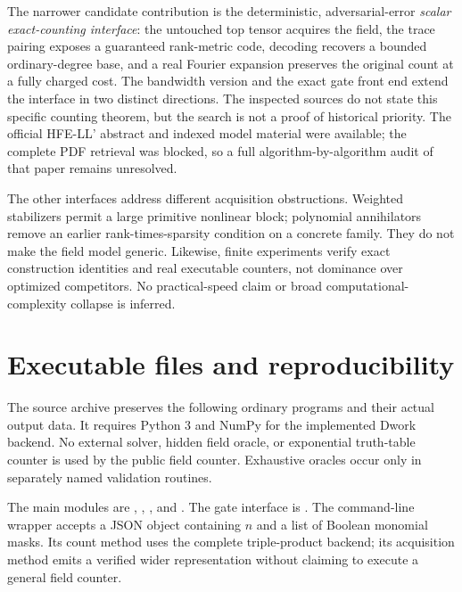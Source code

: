 \documentclass[11pt]{article}
\theoremstyle{remark}\newtheorem{remark}[theorem]{Remark}
\begin{document}
The narrower candidate contribution is the deterministic, adversarial-error \emph{scalar exact-counting interface}: the untouched top tensor acquires the field, the trace pairing exposes a guaranteed rank-metric code, decoding recovers a bounded ordinary-degree base, and a real Fourier expansion preserves the original count at a fully charged cost. The bandwidth version and the exact gate front end extend the interface in two distinct directions. The inspected sources do not state this specific counting theorem, but the search is not a proof of historical priority. The official HFE-LL' abstract and indexed model material were available; the complete PDF retrieval was blocked, so a full algorithm-by-algorithm audit of that paper remains unresolved.

The other interfaces address different acquisition obstructions. Weighted stabilizers permit a large primitive nonlinear block; polynomial annihilators remove an earlier rank-times-sparsity condition on a concrete family. They do not make the field model generic. Likewise, finite experiments verify exact construction identities and real executable counters, not dominance over optimized competitors. No practical-speed claim or broad computational-complexity collapse is inferred.

\section{Executable files and reproducibility}
The source archive preserves the following ordinary programs and their actual output data. It requires Python 3 and NumPy for the implemented Dwork backend. No external solver, hidden field oracle, or exponential truth-table counter is used by the public field counter. Exhaustive oracles occur only in separately named validation routines.

The main modules are , , , and . The gate interface is . The command-line wrapper accepts a JSON object containing $n$ and a list of Boolean monomial masks. Its count method uses the complete triple-product backend; its acquisition method emits a verified wider representation without claiming to execute a general field counter.
\end{document}
